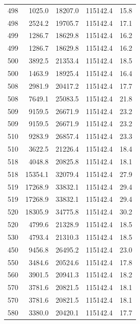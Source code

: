 \begin{longtable}{rrrrr}
    498 & \num{1025.0} & \num{18207.0} & \num{115142.4} & 15.8 \\
    498 & \num{2524.2} & \num{19705.7} & \num{115142.4} & 17.1 \\
    499 & \num{1286.7} & \num{18629.8} & \num{115142.4} & 16.2 \\
    499 & \num{1286.7} & \num{18629.8} & \num{115142.4} & 16.2 \\
    500 & \num{3892.5} & \num{21353.4} & \num{115142.4} & 18.5 \\
    500 & \num{1463.9} & \num{18925.4} & \num{115142.4} & 16.4 \\
    508 & \num{2981.9} & \num{20417.2} & \num{115142.4} & 17.7 \\
    508 & \num{7649.1} & \num{25083.5} & \num{115142.4} & 21.8 \\
    509 & \num{9159.5} & \num{26671.9} & \num{115142.4} & 23.2 \\
    509 & \num{9159.5} & \num{26671.9} & \num{115142.4} & 23.2 \\
    510 & \num{9283.9} & \num{26857.4} & \num{115142.4} & 23.3 \\
    510 & \num{3622.5} & \num{21226.4} & \num{115142.4} & 18.4 \\
    518 & \num{4048.8} & \num{20825.8} & \num{115142.4} & 18.1 \\
    518 & \num{15354.1} & \num{32079.4} & \num{115142.4} & 27.9 \\
    519 & \num{17268.9} & \num{33832.1} & \num{115142.4} & 29.4 \\
    519 & \num{17268.9} & \num{33832.1} & \num{115142.4} & 29.4 \\
    520 & \num{18305.9} & \num{34775.8} & \num{115142.4} & 30.2 \\
    520 & \num{4799.6} & \num{21328.9} & \num{115142.4} & 18.5 \\
    530 & \num{4793.4} & \num{21310.3} & \num{115142.4} & 18.5 \\
    450 & \num{9456.8} & \num{26495.2} & \num{115142.4} & 23.0 \\
    550 & \num{3484.6} & \num{20524.6} & \num{115142.4} & 17.8 \\
    560 & \num{3901.5} & \num{20941.3} & \num{115142.4} & 18.2 \\
    570 & \num{3781.6} & \num{20821.5} & \num{115142.4} & 18.1 \\
    570 & \num{3781.6} & \num{20821.5} & \num{115142.4} & 18.1 \\
    580 & \num{3380.0} & \num{20420.1} & \num{115142.4} & 17.7 \\

\end{longtable}
